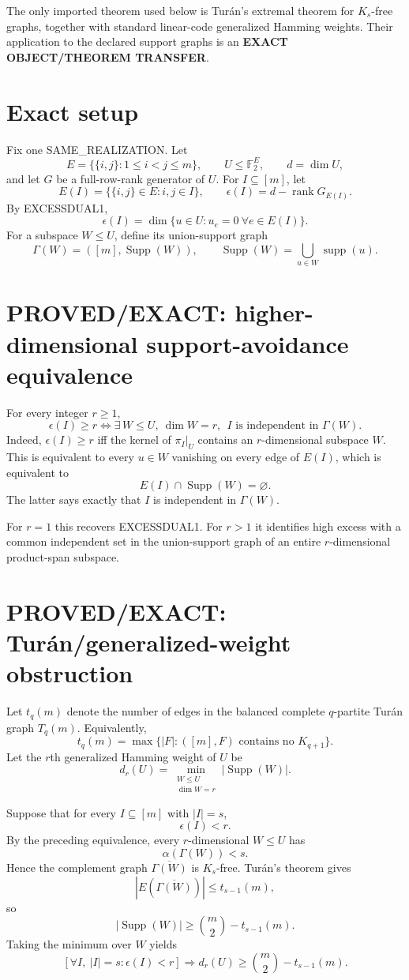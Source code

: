 \documentclass[11pt]{article}
\begin{document}
The only imported theorem used below is Tur\'an's extremal theorem for $K_s$-free graphs, together with standard linear-code generalized Hamming weights. Their application to the declared support graphs is an \textbf{EXACT OBJECT/THEOREM TRANSFER}.

\section*{Exact setup}
Fix one SAME\_REALIZATION. Let
\[
E=\{\{i,j\}:1\le i<j\le m\},\qquad
U\le\mathbb F_2^E,\qquad d=\dim U,
\]
and let $G$ be a full-row-rank generator of $U$. For $I\subseteq[m]$, let
\[
E(I)=\{\{i,j\}\in E:i,j\in I\},\qquad
\epsilon(I)=d-\operatorname{rank}G_{E(I)}.
\]
By EXCESSDUAL1,
\[
\epsilon(I)=\dim\{u\in U:u_e=0\ \forall e\in E(I)\}.
\]
For a subspace $W\le U$, define its union-support graph
\[
\Gamma(W)=([m],\operatorname{Supp}(W)),\qquad
\operatorname{Supp}(W)=\bigcup_{u\in W}\operatorname{supp}(u).
\]

\section*{PROVED/EXACT: higher-dimensional support-avoidance equivalence}
For every integer $r\ge1$,
\[
\boxed{
\epsilon(I)\ge r
\iff
\exists\,W\le U,\ \dim W=r,\ \ I\text{ is independent in }\Gamma(W).
}
\]
Indeed, $\epsilon(I)\ge r$ iff the kernel of $\pi_I|_U$ contains an $r$-dimensional subspace $W$. This is equivalent to every $u\in W$ vanishing on every edge of $E(I)$, which is equivalent to
\[
E(I)\cap\operatorname{Supp}(W)=\varnothing.
\]
The latter says exactly that $I$ is independent in $\Gamma(W)$.

For $r=1$ this recovers EXCESSDUAL1. For $r>1$ it identifies high excess with a common independent set in the union-support graph of an entire $r$-dimensional product-span subspace.

\section*{PROVED/EXACT: Tur\'an/generalized-weight obstruction}
Let $t_q(m)$ denote the number of edges in the balanced complete $q$-partite Tur\'an graph $T_q(m)$. Equivalently,
\[
t_q(m)=\max\{|F|:([m],F)\text{ contains no }K_{q+1}\}.
\]
Let the $r$th generalized Hamming weight of $U$ be
\[
d_r(U)=
\min_{\substack{W\le U\\ \dim W=r}}
|\operatorname{Supp}(W)|.
\]

Suppose that for every $I\subseteq[m]$ with $|I|=s$,
\[
\epsilon(I)<r.
\]
By the preceding equivalence, every $r$-dimensional $W\le U$ has
\[
\alpha(\Gamma(W))<s.
\]
Hence the complement graph $\overline{\Gamma(W)}$ is $K_s$-free. Tur\'an's theorem gives
\[
|E(\overline{\Gamma(W)})|\le t_{s-1}(m),
\]
so
\[
|\operatorname{Supp}(W)|
\ge
\binom m2-t_{s-1}(m).
\]
Taking the minimum over $W$ yields
\[
\boxed{
\left[\forall I,\ |I|=s:\epsilon(I)<r\right]
\Longrightarrow
d_r(U)\ge
\binom m2-t_{s-1}(m).
}
\]
\end{document}
